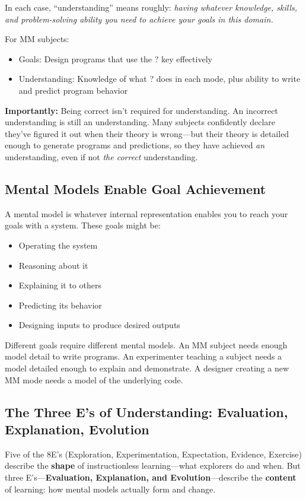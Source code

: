 \documentclass[12pt,letterpaper]{article}
\begin{document}
In each case, ``understanding'' means roughly: \textit{having whatever knowledge, skills, and problem-solving ability you need to achieve your goals in this domain.}

For MM subjects:
\begin{itemize}
\item Goals: Design programs that use the ? key effectively
\item Understanding: Knowledge of what ? does in each mode, plus ability to write and predict program behavior
\end{itemize}

\textbf{Importantly:} Being correct isn't required for understanding. An incorrect understanding is still an understanding. Many subjects confidently declare they've figured it out when their theory is wrong—but their theory is detailed enough to generate programs and predictions, so they have achieved \textit{an} understanding, even if not \textit{the correct} understanding.

\subsection{Mental Models Enable Goal Achievement}

A mental model is whatever internal representation enables you to reach your goals with a system. These goals might be:

\begin{itemize}
\item Operating the system
\item Reasoning about it
\item Explaining it to others
\item Predicting its behavior
\item Designing inputs to produce desired outputs
\end{itemize}

Different goals require different mental models. An MM subject needs enough model detail to write programs. An experimenter teaching a subject needs a model detailed enough to explain and demonstrate. A designer creating a new MM mode needs a model of the underlying code.

\subsection{The Three E's of Understanding: Evaluation, Explanation, Evolution}

Five of the 8E's (Exploration, Experimentation, Expectation, Evidence, Exercise) describe the \textbf{shape} of instructionless learning—what explorers do and when. But three E's—\textbf{Evaluation, Explanation, and Evolution}—describe the \textbf{content} of learning: how mental models actually form and change.
\end{document}
